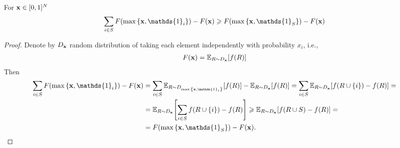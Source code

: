 \begin{lemma}
	For $\vb{x}\in [0,1]^N$
	\begin{align}
	\sum_{i \in S} F\qty(\max\qty{\vb{x}, \mathds{1}_i})-F(\vb{x}) \geqslant F\qty(\max\qty{\vb{x}, \mathds{1}_{S}})-F(\vb{x})
	\end{align}
	\begin{proof}
		Denote by $D_{\vb{x}}$ random distribution of taking each element independently with probability $x_i$, i.e.,
		\begin{align}
		F(\vb{x}) = \mathbb{E}_{R\sim D_{\vb{x}}} [f(R)]
		\end{align}
		Then
		\begin{align}
		\sum_{i \in S} F\qty(\max\qty{\vb{x}, \mathds{1}_i})-F(\vb{x}) &= \sum_{i \in S} \mathbb{E}_{R\sim D_{\max\qty{\vb{x}, \mathds{1}_i}}} [f(R)] - \mathbb{E}_{R\sim D_{\vb{x}}} [f(R)] = \sum_{i \in S}\mathbb{E}_{R\sim D_{\vb{x}}}\qty[f(R\cup \qty{i}) - f(R)] =\\&= \mathbb{E}_{R\sim D_{\vb{x}}}\qty[\sum_{i \in S} f(R\cup \qty{i}) - f(R)] \geqslant \mathbb{E}_{R\sim D_{\vb{x}}}\qty[f(R\cup S) - f(R)] =\\&= F\qty(\max\qty{\vb{x}, \mathds{1}_{S}})-F(\vb{x}).
		\end{align}
	\end{proof}
\end{lemma}
